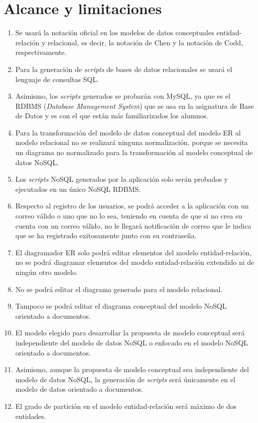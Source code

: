 \section{Alcance y limitaciones}

\begin{enumerate}
    \item Se usará la notación oficial en los modelos de datos conceptuales entidad-relación y relacional, es decir, la notación de Chen y la notación de Codd, respectivamente.
    \item Para la generación de \textit{scripts} de bases de datos relacionales se usará el lenguaje de consultas SQL.
    \item Asimismo, los \textit{scripts} generados se probarán con MySQL, ya que es el RDBMS (\textit{Database Management System}) que se usa en la asignatura de Base de Datos y es con el que están más familiarizados los alumnos.
    \item Para la transformación del modelo de datos conceptual del modelo ER al modelo relacional no se realizará ninguna normalización, porque se necesita un diagrama no normalizado para la transformación al modelo conceptual de datos NoSQL.
    \item Los \textit{scripts} NoSQL generados por la aplicación solo serán probados y ejecutados en un único NoSQL RDBMS.
    \item Respecto al registro de los usuarios, se podrá acceder a la aplicación con un correo válido o uno que no lo sea, teniendo en cuenta de que si no crea su cuenta con un correo válido, no le llegará notificación de correo que le indica que se ha registrado exitosamente junto con su contraseña.
    \item El diagramador ER solo podrá editar elementos del modelo entidad-relación, no se podrá diagramar elementos del modelo entidad-relación extendido ni de ningún otro modelo.
    \item No se podrá editar el diagrama generado para el modelo relacional.
    \item Tampoco se podrá editar el diagrama conceptual del modelo NoSQL orientado a documentos.
    \item El modelo elegido para desarrollar la propuesta de modelo conceptual será independiente del modelo de datos NoSQL o enfocado en el modelo NoSQL orientado a documentos.
    \item Asimismo, aunque la propuesta de modelo conceptual sea independiente del modelo de datos NoSQL, la generación de \textit{scripts} será únicamente en el modelo de datos orientado a documentos.
    \item El grado de partición en el modelo entidad-relación será máximo de dos entidades.
    
    
\end{enumerate}
